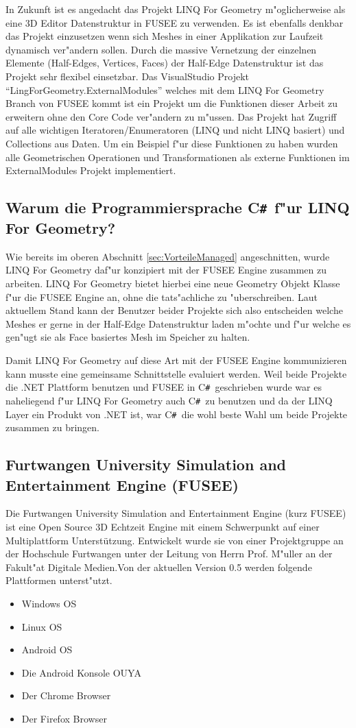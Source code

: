 \documentclass[pagesize, paper=a4, fontsize=12pt,titlepage=true, headings=small, headnosepline, abstractoff, liststotoc, nochapterprefix, plainheadsepline]{scrreprt}
\newcommand{\CSS}{C\texttt{\# }}
\newcommand{\LFG}{LINQ For Geometry}
\newcommand{\LFGS}{LINQ For Geometry }
\newcommand{\HES}{Half-Edge Datenstruktur }
\begin{document}
In Zukunft ist es angedacht das Projekt \LFGS m"oglicherweise als eine 3D Editor Datenstruktur in FUSEE zu verwenden. Es ist ebenfalls denkbar das Projekt einzusetzen wenn sich Meshes in einer Applikation zur Laufzeit dynamisch ver"andern sollen. Durch die massive Vernetzung der einzelnen Elemente (Half-Edges, Vertices, Faces) der \HES ist das Projekt sehr flexibel einsetzbar. Das VisualStudio Projekt "`LingForGeometry.ExternalModules"' welches mit dem \LFGS Branch von FUSEE kommt ist ein Projekt um die Funktionen dieser Arbeit zu erweitern ohne den Core Code ver"andern zu m"ussen. Das Projekt hat Zugriff auf alle wichtigen Iteratoren/Enumeratoren (LINQ und nicht LINQ basiert) und Collections aus Daten. Um ein Beispiel f"ur diese Funktionen zu haben wurden alle Geometrischen Operationen und Transformationen als externe Funktionen im ExternalModules Projekt implementiert.
		\subsection {Warum die Programmiersprache \CSS f"ur \LFG?}
			Wie bereits  im oberen Abschnitt \ref{sec:VorteileManaged} angeschnitten, wurde \LFGS daf"ur konzipiert mit der FUSEE Engine zusammen zu arbeiten. \LFGS bietet hierbei eine neue Geometry Objekt Klasse f"ur die FUSEE Engine an, ohne die tats"achliche zu "uberschreiben. Laut aktuellem Stand kann der Benutzer beider Projekte sich also entscheiden welche Meshes er gerne in der \HES laden m"ochte und f"ur welche es gen"ugt sie als Face basiertes Mesh im Speicher zu halten.

Damit \LFGS auf diese Art mit der FUSEE Engine kommunizieren kann musste eine gemeinsame Schnittstelle evaluiert werden. Weil beide Projekte die .NET Plattform benutzen und FUSEE in \CSS geschrieben wurde war es naheliegend f"ur \LFGS auch \CSS zu benutzen und da der LINQ Layer ein Produkt von .NET ist, war \CSS die wohl beste Wahl um beide Projekte zusammen zu bringen.
		\subsection {Furtwangen University Simulation and Entertainment Engine (FUSEE)}
			Die Furtwangen University Simulation and Entertainment Engine (kurz FUSEE) ist eine Open Source 3D Echtzeit Engine mit einem Schwerpunkt auf einer Multiplattform Unterstützung. Entwickelt wurde sie von einer Projektgruppe an der Hochschule Furtwangen unter der Leitung von Herrn Prof. M"uller an der Fakult"at Digitale Medien.Von der aktuellen Version 0.5 werden folgende Plattformen unterst"utzt.
\begin{itemize}
\item Windows OS
\item Linux OS
\item Android OS
\item Die Android Konsole OUYA
\item Der Chrome Browser
\item Der Firefox Browser
\end{itemize}
\end{document}
